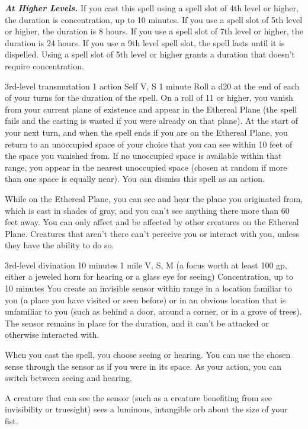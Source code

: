 \documentclass[10pt,twoside,twocolumn,openany]{book}
\newcommand\impact[1]{
	\textbf{\textit{#1}}
}
\begin{document}
\impact{At Higher Levels.} If you cast this spell using a spell slot of 4th level or higher, the duration is concentration, up to 10 minutes. If you use a spell slot of 5th level or higher, the duration is 8 hours. If you use a spell slot of 7th level or higher, the duration is 24 hours. If you use
a 9th level spell slot, the spell lasts until it is dispelled. Using a spell slot of 5th level or higher grants a duration that doesn't require concentration.

{3rd-level transmutation}
{\color{action} 1 action}
{Self}
{V, S}
{1 minute}
%
Roll a d20 at the end of each of your turns for the duration of the spell. On a roll of 11 or higher, you vanish from your current plane of existence and appear in the Ethereal Plane (the spell fails and the casting is wasted if you were already on that plane). At the start of your next turn, and when the spell ends if you are on the Ethereal Plane, you return to an unoccupied space of your choice that you can see within 10 feet of the space you vanished from. If no unoccupied space is available within that range, you appear in the nearest unoccupied space (chosen at random if more than one space is equally near). You can dismiss this spell as an action.

While on the Ethereal Plane, you can see and hear the plane you originated from, which is cast in shades of gray, and you can't see anything there more than 60 feet away. You can only affect and be affected by other creatures on the Ethereal Plane. Creatures that aren't there can't perceive you or interact with you, unless they have the ability to do so.

{3rd-level divination}
{10 minutes}
{1 mile}
{V, S, M (a focus worth at least {\color{cost}100 \nolinebreak gp}, either a jeweled horn for hearing or a glass eye for seeing)}
{{\color{concentration}Concentration}, up to 10 minutes}
You create an invisible sensor within range in a location familiar to you (a place you have visited or seen before) or in an obvious location that is unfamiliar to you (such as behind a door, around a corner, or in a grove of trees). The sensor remains in place for the duration, and it can't be attacked or otherwise interacted with.

When you cast the spell, you choose seeing or hearing. You can use the chosen sense through the sensor as if you were in its space. As your action, you can switch between seeing and hearing.

A creature that can see the sensor (such as a creature benefiting from see invisibility or truesight) sees a luminous, intangible orb about the size of your fist.
\end{document}
